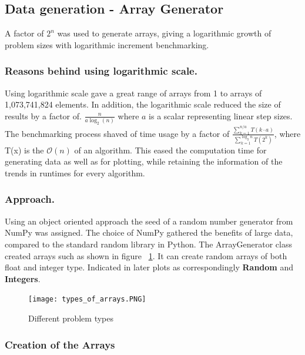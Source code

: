 \documentclass[sigconf, nonacm, natbib, screen, balance=False]{acmart}
\begin{document}
\subsection{Data generation - Array Generator}\label{sec:methdata}
A factor of $2^n$ was used to generate arrays, giving a logarithmic growth of problem sizes with logarithmic increment benchmarking. 

\subsubsection{Reasons behind using logarithmic scale.}\label{sec:datareason} Using logarithmic scale gave a great range of arrays from 1 to arrays of 1,073,741,824 elements. In addition, the logarithmic scale reduced the size of results by a factor of. $\frac{n}{a \log_2(n)}$ where $a$ is a scalar representing linear step sizes. The benchmarking process shaved of time usage by a factor of $\frac{\sum_{k=1}^{n/a}T\left(k\cdot a \right)}{\sum_{k=1}^{\log_{2}n}T \left(2^{k}\right)}$, where T(x) is the $\mathcal{O}(n)$ of an algorithm. This eased the computation time for generating data as well as for plotting, while retaining the information of the trends in runtimes for every algorithm. 

\subsubsection{Approach.}\label{sec:dataapproach}Using an object oriented approach the seed of a random number generator from NumPy was assigned. The choice of NumPy gathered the benefits of large data, compared to the standard random library in Python. 
The ArrayGenerator class created arrays such as shown in figure ~\ref{fig:arrays}. It can create random arrays of both float and integer type. Indicated in later plots as correspondingly \textbf{Random} and \textbf{Integers}. 

\begin{figure}[h]
  \centering
  \texttt{[image: types\_of\_arrays.PNG]}
  \caption{Different problem types}
  \label{fig:arrays}
\end{figure}


\subsubsection{Creation of the Arrays}\label{sec:createarrays}
\end{document}
